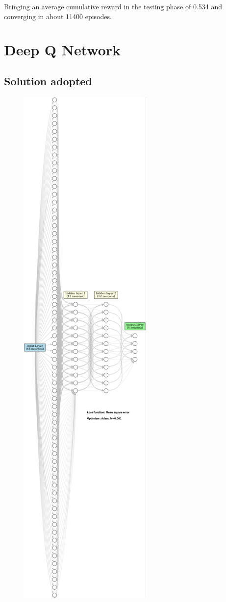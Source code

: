 \documentclass{article}
\begin{document}
Bringing an average cumulative reward in the testing phase of 0.534 and converging in about 11400 episodes.



\section{Deep Q Network}

\subsection{Solution adopted}

\begin{figure}[h]
    \centering
    \includegraphics[height=\textheight]{NN_architecture2.png}
    \label{fig:nn_architecture}
\end{figure}
\clearpage
\end{document}
